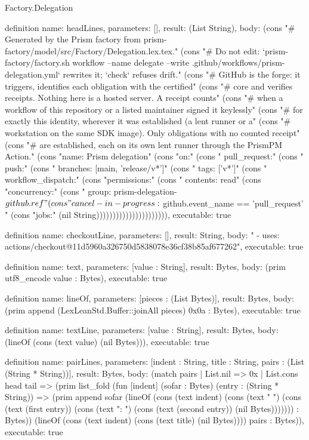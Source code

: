 \begin{lexlean}{Factory.Delegation}
\begin{semanticmodule}
definition{
  name: headLines,
  parameters: [],
  result: (List String),
  body: (cons "# Generated by the Prism factory from prism-factory/model/src/Factory/Delegation.lex.tex." (cons "# Do not edit: `prism-factory/factory.sh workflow --name delegate --write .github/workflows/prism-delegation.yml` rewrites it; `check` refuses drift." (cons "# GitHub is the forge: it triggers, identifies each obligation with the certified" (cons "# core and verifies receipts. Nothing here is a hosted server. A receipt counts" (cons "# when a workflow of this repository or a listed maintainer signed it keylessly" (cons "# for exactly this identity, wherever it was established (a lent runner or a" (cons "# workstation on the same SDK image). Only obligations with no counted receipt" (cons "# are established, each on its own lent runner through the PrismPM Action." (cons "name: Prism delegation" (cons "on:" (cons "  pull_request:" (cons "  push:" (cons "    branches: [main, 'release/v*']" (cons "    tags: ['v*']" (cons "  workflow_dispatch:" (cons "permissions:" (cons "  contents: read" (cons "concurrency:" (cons "  group: prism-delegation-${{ github.ref }}" (cons "  cancel-in-progress: ${{ github.event_name == 'pull_request' }}" (cons "jobs:" (nil String)))))))))))))))))))))),
  executable: true
}

definition{
  name: checkoutLine,
  parameters: [],
  result: String,
  body: "      - uses: actions/checkout@11d5960a326750d5838078e36cf38b85af677262",
  executable: true
}

definition{
  name: text,
  parameters: [value : String],
  result: Bytes,
  body: (prim utf8_encode value : Bytes),
  executable: true
}

definition{
  name: lineOf,
  parameters: [pieces : (List Bytes)],
  result: Bytes,
  body: (prim append (LexLeanStd.Buffer::joinAll pieces) 0x0a : Bytes),
  executable: true
}

definition{
  name: textLine,
  parameters: [value : String],
  result: Bytes,
  body: (lineOf (cons (text value) (nil Bytes))),
  executable: true
}

definition{
  name: pairLines,
  parameters: [indent : String, title : String, pairs : (List (String * String))],
  result: Bytes,
  body: (match pairs
      | List.nil => 0x
      | List.cons head tail => (prim list_fold (fun [indent] (sofar : Bytes) (entry : (String * String)) => (prim append sofar (lineOf (cons (text indent) (cons (text "  ") (cons (text (first entry)) (cons (text ": ") (cons (text (second entry)) (nil Bytes))))))) : Bytes)) (lineOf (cons (text indent) (cons (text title) (nil Bytes)))) pairs : Bytes)),
  executable: true
}


\end{semanticmodule}
\end{lexlean}
